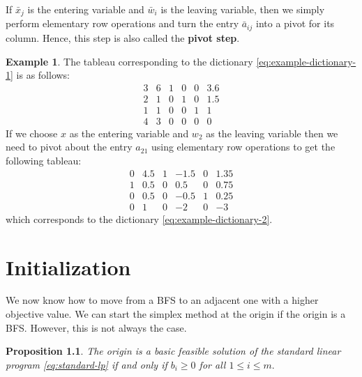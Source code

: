 \documentclass[
]{book}
\newtheorem{proposition}{Proposition}[chapter]
\theoremstyle{definition}
\theoremstyle{definition}
\newtheorem{example}{Example}[chapter]
\theoremstyle{definition}
\theoremstyle{definition}
\theoremstyle{remark}
\begin{document}
If \(\bar{x}_j\) is the entering variable and \(\bar{w}_i\) is the leaving variable, then we simply perform elementary row operations and turn the entry \(\bar{a}_{ij}\) into a pivot for its column. Hence, this step is also called the \textbf{pivot step}.

\begin{example}
The tableau corresponding to the dictionary \eqref{eq:example-dictionary-1} is as follows:
\begin{equation*}
  \begin{array}{lllll|l}
    3 & 6 & 1 & 0 & 0 & 3.6 \\
    \boxed{2} & 1 & 0 & 1 & 0 & 1.5 \\
    1  & 1 & 0 & 0 & 1 & 1 \\ \hline 
    4 & 3 & 0 & 0 & 0 & 0
  \end{array}
\end{equation*}
If we choose \(x\) as the entering variable and \(w_2\) as the leaving variable then we need to pivot about the entry \(a_{21}\) using elementary row operations to get the following tableau:
\begin{equation*}
  \begin{array}{lllll|l}
    0 & 4.5 & 1 & -1.5 & 0 & 1.35 \\
    \boxed{1} & 0.5 & 0 & 0.5 & 0 & 0.75 \\
    0  & 0.5 & 0 & -0.5 & 1 & 0.25 \\ \hline
    0 & 1 & 0 & -2 & 0 & -3
  \end{array}
\end{equation*}
which corresponds to the dictionary \eqref{eq:example-dictionary-2}.
\end{example}

\hypertarget{initialization}{%
\chapter{Initialization}\label{initialization}}

We now know how to move from a BFS to an adjacent one with a higher objective value.
We can start the simplex method at the origin if the origin is a BFS. However, this is not always the case.

\begin{proposition}
The origin is a basic feasible solution of the standard linear program \eqref{eq:standard-lp} if and only if \(b_i \ge 0\) for all \(1 \le i \le m.\)
\end{proposition}
\end{document}
